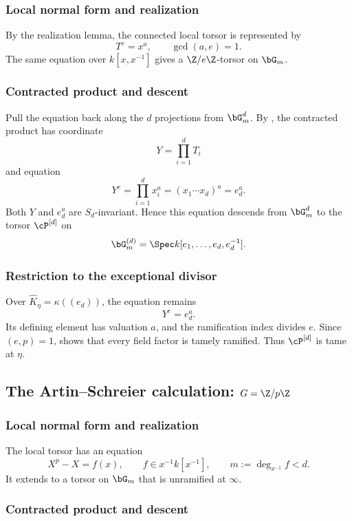 \subsubsection*{Local normal form and realization}

By the realization lemma, the connected local torsor is represented by
\[
    T^e=x^a,
    \qquad \gcd(a,e)=1.
\]
The same equation over $k[x,x^{-1}]$ gives a $\Z/e\Z$-torsor on $\bG_m$.

\subsubsection*{Contracted product and descent}

Pull the equation back along the $d$ projections from $\bG_m^d$. By
, the contracted product has
coordinate
\[
    Y=\prod_{i=1}^dT_i
\]
and equation
\[
    Y^e=\prod_{i=1}^d x_i^a=(x_1\cdots x_d)^a=e_d^a.
\]
Both $Y$ and $e_d^a$ are $S_d$-invariant. Hence this equation descends from
$\bG_m^d$ to the torsor $\cP^{[d]}$ on
\[
   \bG_m^{(d)}=\Spec k[e_1,\dots,e_d,e_d^{-1}].
\]

\subsubsection*{Restriction to the exceptional divisor}

Over $\widehat K_\eta=\kappa((e_d))$, the equation remains
\[
     Y^e=e_d^a.
\]
Its defining element has valuation $a$, and the ramification index divides
$e$. Since $(e,p)=1$,  shows that every
field factor is tamely ramified. Thus $\cP^{[d]}$ is tame at $\eta$.

\subsection{\texorpdfstring{The Artin--Schreier calculation: $G=\Z/p\Z$}{The Artin--Schreier calculation}}

\subsubsection*{Local normal form and realization}

The local torsor has an equation
\[
    X^p-X=f(x),
    \qquad f\in x^{-1}k[x^{-1}],
    \qquad m:=\deg_{x^{-1}}f<d.
\]
It extends to a torsor on $\bG_m$ that is unramified at $\infty$.

\subsubsection*{Contracted product and descent}


